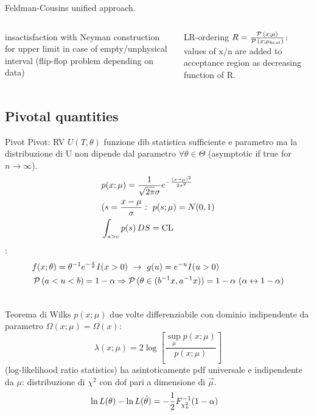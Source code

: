 \begin{frame}{Feldman-Cousins unified approach.}
\begin{columns}[T]
\begin{column}{0.5\textwidth}
insactisfaction with Neyman construction for upper limit in case of empty/unphysical interval (flip-flop problem depending on data)
\end{column}
\begin{column}{0.5\textwidth}
LR-ordering $R=\frac{\operatorname{\mathcal{P}}{(x;\mu)}}{\operatorname{\mathcal{P}}{(x;\mu_{best})}}$: values of x/n are added to acceptance region as decreasing function of R.
\end{column}
\end{columns}
\end{frame}

\subsection{Pivotal quantities}

\begin{frame}{Pivot}
Pivot: RV $U(T,\theta)$ funzione dib statistica sufficiente e parametro ma la distribuzione di U non dipende dal parametro $\forall \theta\in\Theta$ (asymptotic if true for $n\to\infty$).
\begin{align*}
&p(x;\mu)=\frac{1}{\sqrt{2\pi}\sigma}e^{-\frac{(x-\mu)^2}{2\sigma^2}}\\
&(s=\frac{x-\mu}{\sigma}:\ p(s;\mu)=N(0,1)\\
&\int_{s>c}p(s)\,DS=\operatorname{CL}{}
\end{align*}
:
\begin{align*}
&f(x;\theta)=\invers{\theta}\exp{-\frac{x}{\theta}}I(x>0)\ \to\ g(u)=\exp{-u}I(u>0)\\
&\prob{(a<u<b)}=1-\alpha\Rightarrow\prob{(\theta\in(\invers{b}x,\invers{a}x))}=1-\alpha\ (\alpha\leftrightarrow1-\alpha)\\
&
\end{align*}
\end{frame}

\begin{frame}{Teorema di Wilks}
$p(x;\mu)$ due volte differenziabile con dominio indipendente da parametro $\Omega(x;\mu)=\Omega(x)$: \[\lambda(x;\mu)=2\log{[\frac{\sup_{\mu}{p(x;\mu)}}{p(x;\mu)}]}\] (log-likelihood ratio statistics) ha asintoticamente pdf universale e indipendente da $\mu$: distribuzione di $\chi^2$ con dof pari a dimensione di $\vec{\mu}$.
\begin{align*}
&\ln{L(\theta)}-\ln{L(\hat{\theta})}=-\frac{1}{2}{F}^{-1}_{\chi_n^2}(1-\alpha)
\end{align*}
\end{frame}

